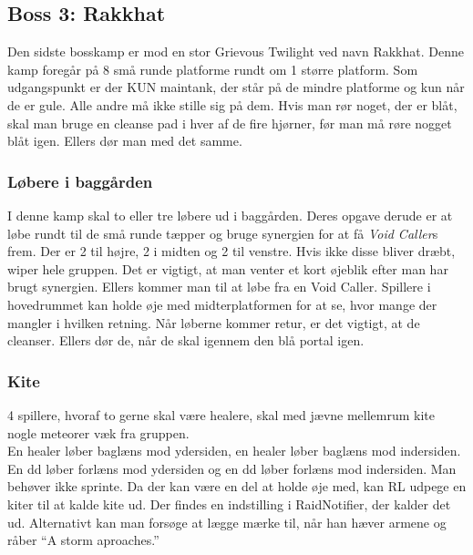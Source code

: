 \subsection*{Boss 3: Rakkhat}
Den sidste bosskamp er mod en stor Grievous Twilight ved navn Rakkhat.
Denne kamp foregår på 8 små runde platforme rundt om 1 større platform. Som
udgangspunkt er der KUN maintank, der står på de mindre platforme og kun når de
er gule. Alle andre må ikke stille sig på dem. 
Hvis man rør noget, der er blåt, skal man bruge en cleanse pad i hver af de
fire hjørner, før man må røre nogget blåt igen. Ellers dør man med det samme.
\subsubsection*{Løbere i baggården}
I denne kamp skal to eller tre løbere ud i baggården. Deres opgave derude er at
løbe rundt til de små runde tæpper og bruge synergien for at få \emph{Void
Caller}s frem. Der er 2 til højre, 2 i midten og 2 til venstre. Hvis ikke disse
bliver dræbt, wiper hele gruppen. Det er vigtigt, at man venter et kort øjeblik
efter man har brugt synergien. Ellers kommer man til at løbe fra en Void
Caller. Spillere i hovedrummet kan holde øje med midterplatformen for at se,
hvor mange der mangler i hvilken retning. Når løberne kommer retur, er det
vigtigt, at de cleanser. Ellers dør de, når de skal igennem den blå portal
igen.
\subsubsection*{Kite}
4 spillere, hvoraf to gerne skal være healere, skal med jævne mellemrum kite
nogle meteorer væk fra gruppen.\\
En healer løber baglæns mod ydersiden, en healer løber baglæns mod
indersiden.\\
En dd løber forlæns mod ydersiden og en dd løber forlæns mod indersiden. Man
behøver ikke sprinte.
Da der kan være en del at holde øje med, kan RL udpege en kiter til at kalde
kite ud. Der findes en indstilling i RaidNotifier, der kalder det ud.
Alternativt kan man forsøge at lægge mærke til, når han hæver armene og råber
``A storm aproaches.''
